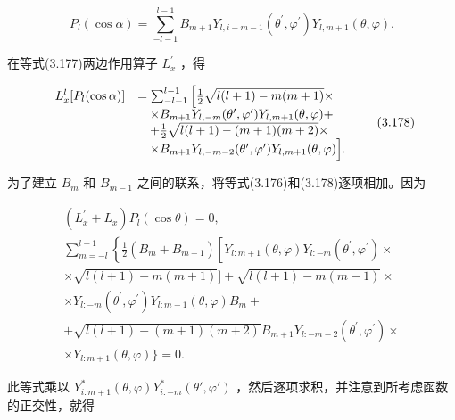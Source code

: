 \begin{equation*}
P _ {l} (\cos \alpha) = \sum_ {- l - 1} ^ {l - 1} B _ {m + 1} Y _ {l, i - m - 1} \left(\theta^ {\prime}, \varphi^ {\prime}\right) Y _ {l, m + 1} (\theta , \varphi).\tag{3.177}
\end{equation*}

在等式(3.177)两边作用算子 $L_{x}^{\prime}$ ，得

\begin{equation*}
\begin{array}{r l} L _ {x} ^ {l} [ P _ {l} (\cos \alpha) ] & = \sum_ {- l - 1} ^ {l - 1} \left[ \frac {1}{2} \sqrt {l (l + 1) - m (m + 1)} \times \right. \\ & \quad \times B _ {m + 1} Y _ {l, - m} (\theta^ {\prime}, \varphi^ {\prime}) Y _ {l, m + 1} (\theta , \varphi) + \\ & \quad + \frac {1}{2} \sqrt {l (l + 1) - (m + 1) (m + 2)} \times \\ & \quad \times B _ {m + 1} Y _ {l, - m - 2} (\theta^ {\prime}, \varphi^ {\prime}) Y _ {l, m + 1} (\theta , \varphi) \Big ]. \end{array} \tag{3.178}
\end{equation*}

为了建立 $B_{m}$ 和 $B_{m - 1}$ 之间的联系，将等式(3.176)和(3.178)逐项相加。因为

\begin{equation*}
\begin{array}{l} \left(L _ {x} ^ {\prime} + L _ {x}\right) P _ {l} (\cos \theta) = 0, \\ \sum_ {m = - l} ^ {l - 1} \left\{\frac {1}{2} \left(B _ {m} + B _ {m + 1}\right) \left[ Y _ {l: m + 1} (\theta , \varphi) Y _ {l: - m} \left(\theta^ {\prime}, \varphi^ {\prime}\right) \times \right. \right. \\ \times \sqrt {l (l + 1) - m (m + 1)} ] + \sqrt {l (l + 1) - m (m - 1)} \times \\ \times Y _ {l: - m} \left(\theta^ {\prime}, \varphi^ {\prime}\right) Y _ {l: m - 1} (\theta , \varphi) B _ {m} + \\ + \sqrt {l (l + 1) - (m + 1) (m + 2)} B _ {m + 1} Y _ {l: - m - 2} \left(\theta^ {\prime}, \varphi^ {\prime}\right) \times \\ \times Y _ {l: m + 1} (\theta , \varphi) \Bigg \} = 0. \end{array} \tag{3.179}
\end{equation*}

此等式乘以 $Y_{i:m+1}^{*}(\theta, \varphi) Y_{i:-m}^{*}(\theta', \varphi')$ ，然后逐项求积，并注意到所考虑函数的正交性，就得

